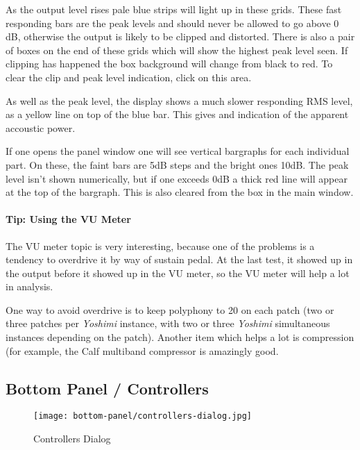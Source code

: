    As the output level rises pale blue strips will light up in these grids.
   These fast responding bars are the peak levels and should never be allowed
   to go above 0 dB, otherwise the output is likely to be clipped and distorted.
   There is also a pair of boxes on the end of these grids which will show the
   highest peak level seen. If clipping has happened the box background will
   change from black to red.
   To clear the clip and peak level indication, click on this area.

   As well as the peak level, the display shows a much slower responding RMS
   level, as a yellow line on top of the blue bar. This gives and indication of
   the apparent accoustic power.

   If one opens the panel window one will see vertical bargraphs for each
   individual part. On these, the faint bars are 5dB steps and the bright ones
   10dB. The peak level isn't shown numerically, but if one exceeds 0dB a thick
   red line will appear at the top of the bargraph. This is also cleared from
   the box in the main window.

\paragraph{Tip: Using the VU Meter}
\label{paragraph:tips_using_the_vu_meter}

   The VU meter topic is very interesting, because one of the problems
   is a tendency to overdrive it by way of sustain pedal.  At the last test, it
   showed up in the output before it showed up in the VU meter, so
   the VU meter will help a lot in analysis.

   One way to avoid overdrive is to keep polyphony to 20 on each patch (two
   or three patches per \textsl{Yoshimi} instance, with two or three
   \textsl{Yoshimi} simultaneous instances depending on the patch).
   Another item which helps a lot is compression (for example, the Calf
   multiband compressor is amazingly good.

\subsection{Bottom Panel / Controllers}
\label{subsec:bottom_panel_controllers}

\begin{figure}[H]
   \centering 
   \texttt{[image: bottom-panel/controllers-dialog.jpg]}
   \caption{Controllers Dialog}
   \label{fig:controllers_dialog}
\end{figure}

